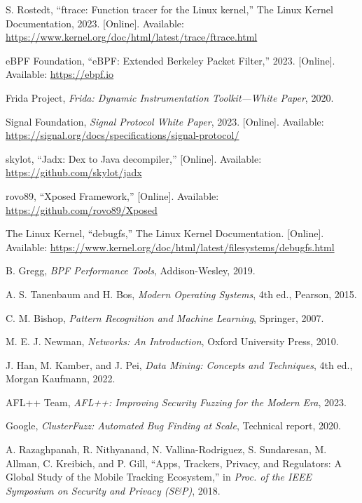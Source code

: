 \documentclass[a4paper,12pt]{report}
\begin{document}
\begin{thebibliography}{99}
S. Rostedt, “ftrace: Function tracer for the Linux kernel,” The Linux Kernel Documentation, 2023. [Online]. Available: \url{https://www.kernel.org/doc/html/latest/trace/ftrace.html}

eBPF Foundation, “eBPF: Extended Berkeley Packet Filter,” 2023. [Online]. Available: \url{https://ebpf.io}

Frida Project, \emph{Frida: Dynamic Instrumentation Toolkit—White Paper}, 2020.

Signal Foundation, \emph{Signal Protocol White Paper}, 2023. [Online]. Available: \url{https://signal.org/docs/specifications/signal-protocol/}

skylot, “Jadx: Dex to Java decompiler,” [Online]. Available: \url{https://github.com/skylot/jadx}

rovo89, “Xposed Framework,” [Online]. Available: \url{https://github.com/rovo89/Xposed}

The Linux Kernel, “debugfs,” The Linux Kernel Documentation. [Online]. Available: \url{https://www.kernel.org/doc/html/latest/filesystems/debugfs.html}

B. Gregg, \emph{BPF Performance Tools}, Addison-Wesley, 2019.

A. S. Tanenbaum and H. Bos, \emph{Modern Operating Systems}, 4th ed., Pearson, 2015.

C. M. Bishop, \emph{Pattern Recognition and Machine Learning}, Springer, 2007.

M. E. J. Newman, \emph{Networks: An Introduction}, Oxford University Press, 2010.

J. Han, M. Kamber, and J. Pei, \emph{Data Mining: Concepts and Techniques}, 4th ed., Morgan Kaufmann, 2022.

AFL++ Team, \emph{AFL++: Improving Security Fuzzing for the Modern Era}, 2023.

Google, \emph{ClusterFuzz: Automated Bug Finding at Scale}, Technical report, 2020.

A. Razaghpanah, R. Nithyanand, N. Vallina-Rodriguez, S. Sundaresan, M. Allman, C. Kreibich, and P. Gill, “Apps, Trackers, Privacy, and Regulators: A Global Study of the Mobile Tracking Ecosystem,” in \emph{Proc. of the IEEE Symposium on Security and Privacy (S\&P)}, 2018.

\end{thebibliography}
\appendix
\end{document}
